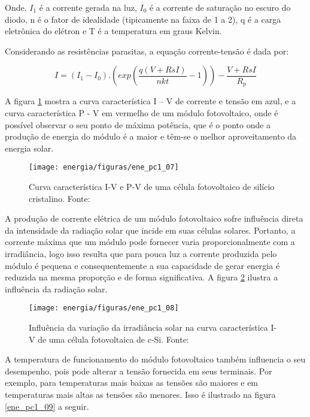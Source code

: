 	Onde, $I_1$ é a corrente gerada na luz, $I_0$ é a corrente de saturação no escuro do diodo, n é o fator de idealidade (tipicamente na faixa de 1 a 2), q é a carga eletrônica do elétron e T é a temperatura em graus Kelvin.
	
	Considerando as resistências parasitas, a equação corrente-tensão é dada por:
	
	\begin{equation}
	I = (I_1 - I_0) . (exp(\dfrac{q(V + RsI)}{nkt} - 1)) - \dfrac{V + RsI}{R_p}
	\end{equation}
	 
	A figura \ref{ene_pc1_07} mostra a curva característica I – V de corrente e tensão em azul, e a  curva característica P - V em vermelho de um módulo fotovoltaico, onde é possível observar o seu ponto de máxima potência, que é o ponto onde a produção de energia do módulo é a maior e têm-se o melhor aproveitamento da energia solar.
	
		
\begin{figure}[H]
		\centering
		\texttt{[image: energia/figuras/ene\_pc1\_07]}
		\caption{Curva característica I-V e P-V de uma célula fotovoltaico de silício cristalino. Fonte:\cite{Cresesb}}
		\label{ene_pc1_07}
	\end{figure}

	A produção de corrente elétrica de um módulo fotovoltaico sofre influência direta da intensidade da radiação solar que incide em suas células solares. Portanto, a corrente máxima que um módulo pode fornecer varia proporcionalmente com a irradiância, logo isso resulta que para pouca luz a corrente produzida pelo módulo é pequena e consequentemente a sua capacidade de gerar energia é reduzida na mesma proporção e de forma significativa. A figura \ref{ene_pc1_08} ilustra a influência da radiação solar.
	
\begin{figure}[H]
		\centering
		\texttt{[image: energia/figuras/ene\_pc1\_08]}
		\caption{Influência da variação da irradiância solar na curva característica I-V de uma célula fotovoltaica de c-Si. Fonte: \cite{Cresesb}}
		\label{ene_pc1_08}
	\end{figure}

	A temperatura de funcionamento do módulo fotovoltaico também influencia o seu desempenho, pois pode alterar a tensão fornecida em seus terminais. Por exemplo, para temperaturas mais baixas as tensões são maiores e em temperaturas mais altas as tensões são menores. Isso é ilustrado na figura \ref{ene_pc1_09} a seguir.
	
